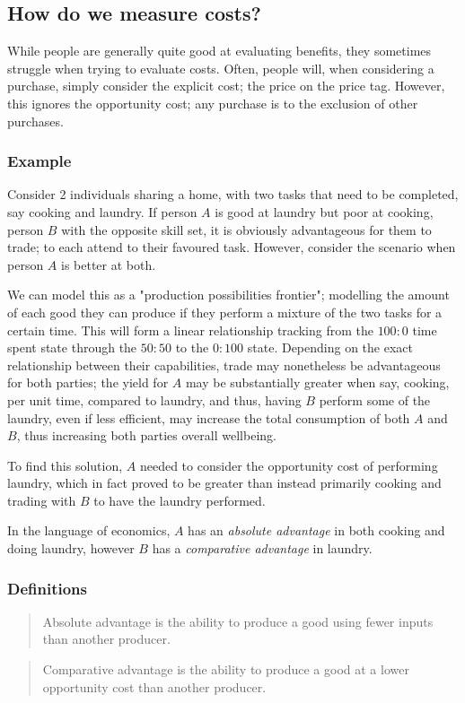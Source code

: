 \documentclass[12pt]{report}
\begin{document}
\begin{flushleft}
\subsection*{How do we measure costs?}
While people are generally quite good at evaluating benefits, they sometimes struggle when
trying to evaluate costs. Often, people will, when considering a purchase, simply consider the 
explicit cost; the price on the price tag. However, this ignores the opportunity cost; any
purchase is to the exclusion of other purchases.

\subsubsection*{Example}
Consider 2 individuals sharing a home, with two tasks that need to be completed, say 
cooking and laundry. If person \(A\) is good at laundry but poor at cooking, person \(B\)
with the opposite skill set, it is obviously advantageous for them to trade; to each
attend to their favoured task. However, consider the scenario when person \(A\) is better
at both.
\par
We can model this as a "production possibilities frontier"; modelling the amount of each
good they can produce if they perform a mixture of the two tasks for a certain time. This will
form a linear relationship tracking from the \(100:0\) time spent state through the \(50:50\) to the \(0:100\) state. Depending on the 
exact relationship between their capabilities, trade may nonetheless be advantageous for both 
parties; the yield for \(A\) may be substantially greater when say, cooking, per unit time,
compared to laundry, and thus, having \(B\) perform some of the laundry, even if less efficient,
may increase the total consumption of both \(A\) and \(B\), thus increasing both parties overall
wellbeing. 
\par
To find this solution, \(A\) needed to consider the opportunity cost of performing laundry,
which in fact proved to be greater than instead primarily cooking and trading with \(B\) to have the laundry
performed.
\par
In the language of economics, \(A\) has an \textit{absolute advantage} in both cooking and doing laundry,
however \(B\) has a \textit{comparative advantage} in laundry.

\subsubsection*{Definitions}
\begin{quotation}    
Absolute advantage is the ability to produce a good using fewer inputs than another producer.
\end{quotation}
\begin{quotation}
Comparative advantage is the ability to produce a good at a lower opportunity cost than another producer.    
\end{quotation}


\end{flushleft}
\end{document}

